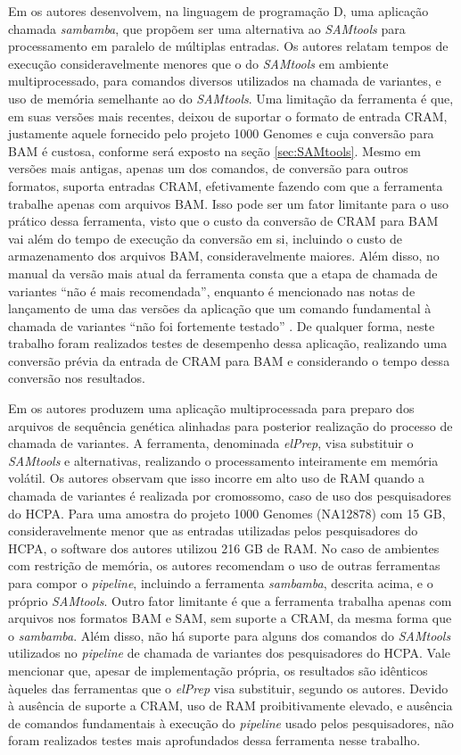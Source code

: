 \documentclass[cic,tc]{iiufrgs}
\begin{document}
Em \cite{tarasov2015sambamba} os autores desenvolvem, na linguagem de
programação D, uma aplicação chamada \textit{sambamba}, que propõem ser uma alternativa
ao \textit{SAMtools} para processamento em paralelo de múltiplas entradas. Os autores
relatam tempos de execução consideravelmente menores que o do \textit{SAMtools} em
ambiente multiprocessado, para comandos diversos utilizados na chamada de
variantes, e uso de memória semelhante ao do \textit{SAMtools}. Uma limitação da
ferramenta é que, em suas versões mais recentes, deixou de suportar o formato
de entrada CRAM, justamente aquele fornecido pelo projeto 1000 Genomes e cuja
conversão para BAM é custosa, conforme será exposto na seção
\ref{sec:SAMtools}. Mesmo em versões mais antigas, apenas um dos comandos, de
conversão para outros formatos, suporta entradas CRAM, efetivamente fazendo com
que a ferramenta trabalhe apenas com arquivos BAM. Isso pode ser um fator
limitante para o uso prático dessa ferramenta, visto que o custo da conversão
de CRAM para BAM vai além do tempo de execução da conversão em si, incluindo o
custo de armazenamento dos arquivos BAM, consideravelmente maiores. Além disso,
no manual da versão mais atual da ferramenta consta que a etapa de chamada de
variantes ``não é mais recomendada'', enquanto é mencionado nas notas de
lançamento de uma das versões da aplicação que um comando fundamental à chamada
de variantes ``não foi fortemente testado'' \cite{manual2015sambamba}. De
qualquer forma, neste trabalho foram realizados testes de desempenho dessa
aplicação, realizando uma conversão prévia da entrada de CRAM para BAM e
considerando o tempo dessa conversão nos resultados.

Em \cite{herzeel2015elprep} os autores produzem uma aplicação
multiprocessada para preparo dos arquivos de sequência genética alinhadas para
posterior realização do processo de chamada de variantes. A ferramenta,
denominada \textit{elPrep}, visa substituir o \textit{SAMtools} e alternativas, realizando o
processamento inteiramente em memória volátil. Os autores observam que isso
incorre em alto uso de RAM quando a chamada de variantes é realizada por
cromossomo, caso de uso dos pesquisadores do HCPA. Para uma amostra do projeto
1000 Genomes (NA12878) com 15 GB, consideravelmente menor que as entradas
utilizadas pelos pesquisadores do HCPA, o software dos autores utilizou 216 GB
de RAM. No caso de ambientes com restrição de memória, os autores recomendam o
uso de outras ferramentas para compor o \textit{pipeline}, incluindo a ferramenta
\textit{sambamba}, descrita acima, e o próprio \textit{SAMtools}. Outro fator limitante é que a
ferramenta trabalha apenas com arquivos nos formatos BAM e SAM, sem suporte a
CRAM, da mesma forma que o \textit{sambamba}. Além disso, não há suporte para alguns dos
comandos do \textit{SAMtools} utilizados no \textit{pipeline} de chamada de variantes dos
pesquisadores do HCPA. Vale mencionar que, apesar de implementação própria, os
resultados são idênticos àqueles das ferramentas que o \textit{elPrep} visa substituir,
segundo os autores. Devido à ausência de suporte a CRAM, uso de RAM
proibitivamente elevado, e ausência de comandos fundamentais à execução do
\textit{pipeline} usado pelos pesquisadores, não foram realizados testes mais
aprofundados dessa ferramenta nesse trabalho.
\end{document}
